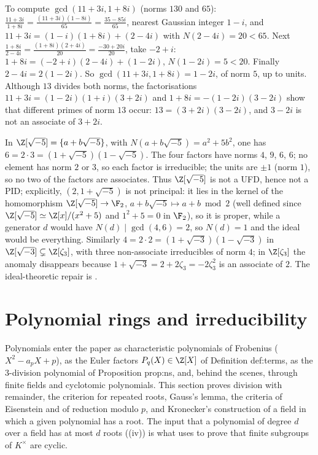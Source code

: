 \begin{example}\label{ex:rings:euclid-gaussian}
To compute $\gcd(11+3i,1+8i)$ (norms $130$ and $65$): $\frac{11+3i}{1+8i}=\frac{(11+3i)(1-8i)}{65}=\frac{35-85i}{65}$, nearest Gaussian integer
$1-i$, and $11+3i=(1-i)(1+8i)+(2-4i)$ with $N(2-4i)=20<65$. Next $\frac{1+8i}{2-4i}=\frac{(1+8i)(2+4i)}{20}=\frac{-30+20i}{20}$, take $-2+i$:
$1+8i=(-2+i)(2-4i)+(1-2i)$, $N(1-2i)=5<20$. Finally $2-4i=2(1-2i)$. So $\gcd(11+3i,1+8i)=1-2i$, of norm $5$, up to units. Although $13$ divides both
norms, the factorisations $11+3i=(1-2i)(1+i)(3+2i)$ and $1+8i=-(1-2i)(3-2i)$ show that different primes of norm $13$ occur:
$13=(3+2i)(3-2i)$, and $3-2i$ is not an associate of $3+2i$.
\end{example}

\begin{example}\label{ex:rings:non-ufd}
In $\Z[\sqrt{-5}]=\{a+b\sqrt{-5}\}$, with $N(a+b\sqrt{-5})=a^2+5b^2$, one has $6=2\cdot3=(1+\sqrt{-5})(1-\sqrt{-5})$. The four factors have norms $4$, $9$, $6$, $6$;
no element has norm $2$ or $3$, so each factor is irreducible; the units are $\pm1$ (norm $1$), so no two of the factors are
associates. Thus $\Z[\sqrt{-5}]$ is not a UFD, hence not a PID; explicitly, $(2,1+\sqrt{-5})$ is not principal: it lies in the kernel of
the homomorphism $\Z[\sqrt{-5}]\to\F_2$, $a+b\sqrt{-5}\mapsto a+b\bmod2$ (well defined since $\Z[\sqrt{-5}]\simeq\Z[x]/(x^2+5)$ and $1^2+5=0$ in $\F_2$), so it is proper,
while a generator $d$ would have $N(d)\mid\gcd(4,6)=2$, so $N(d)=1$ and the ideal would be everything. Similarly
$4=2\cdot2=(1+\sqrt{-3})(1-\sqrt{-3})$ in $\Z[\sqrt{-3}]\subsetneq\Z[\zeta_3]$, with three non-associate irreducibles of norm $4$; in $\Z[\zeta_3]$ the
anomaly disappears because $1+\sqrt{-3}=2+2\zeta_3=-2\zeta_3^2$ is an associate of $2$. The ideal-theoretic repair is .
\end{example}

\section{Polynomial rings and irreducibility}\label{sec:rings:polynomials}

Polynomials enter the paper as characteristic polynomials of Frobenius ($X^2-a_pX+p$), as the Euler factors $P_q(X)\in\Z[X]$ of
Definition def:terms, as the $3$-division polynomial of Proposition prop:ns, and, behind the scenes, through finite
fields and cyclotomic polynomials. This section proves division with remainder, the criterion for repeated roots,
Gauss's lemma, the criteria of Eisenstein and of reduction modulo $p$, and Kronecker's construction of a field in
which a given polynomial has a root. The input that a polynomial of degree $d$ over a field has at most $d$ roots
((iv)) is what  uses to prove that finite subgroups of $K^\times$ are cyclic.

